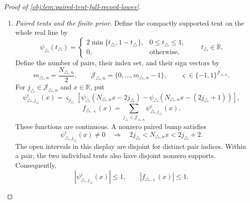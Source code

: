 \begin{proof}[Proof of \cref{obj:lem:paired-tent-full-record-lower}]
\begin{enumerate}
\item \emph{Paired tents and the finite prior.}
Define the compactly supported tent on the whole real line by
\[
\psi_\triangle(t_\triangle)=
\begin{cases}
2\min\{t_\triangle,1-t_\triangle\},&0\le t_\triangle\le1,\\
0,&\text{otherwise},
\end{cases}
\qquad t_\triangle\in\mathbb R.
\]
Define the number of pairs, their index set, and their sign vectors by
\[
m_{\triangle,n}=\frac{N_{\triangle,n}}2,
\qquad
\mathscr J_{\triangle,n}=\{0,\ldots,m_{\triangle,n}-1\},
\qquad
\varsigma\in\{-1,1\}^{\mathscr J_{\triangle,n}}.
\]
For \(j_\triangle\in\mathscr J_{\triangle,n}\) and \(x\in\mathbb R\), put
\[
\psi_{\triangle,j_\triangle}^{\varsigma}(x)
=
\varsigma_{j_\triangle}
\left[
\psi_\triangle(N_{\triangle,n}x-2j_\triangle)
-\psi_\triangle(N_{\triangle,n}x-(2j_\triangle+1))
\right],
\]
\[
f_{\triangle,\varsigma}(x)
=
\sum_{j_\triangle\in\mathscr J_{\triangle,n}}
\psi_{\triangle,j_\triangle}^{\varsigma}(x).
\]
These functions are continuous. A nonzero paired bump satisfies
\[
\psi_{\triangle,j_\triangle}^{\varsigma}(x)\ne0
\quad\Longrightarrow\quad
2j_\triangle<N_{\triangle,n}x<2j_\triangle+2.
\]
The open intervals in this display are disjoint for distinct pair indices.
Within a pair, the two individual tents also have disjoint nonzero supports.
Consequently,
\[
\left|\psi_{\triangle,j_\triangle}^{\varsigma}(x)\right|\le1,
\qquad
|f_{\triangle,\varsigma}(x)|\le1.
\]


\end{enumerate}
\end{proof}
